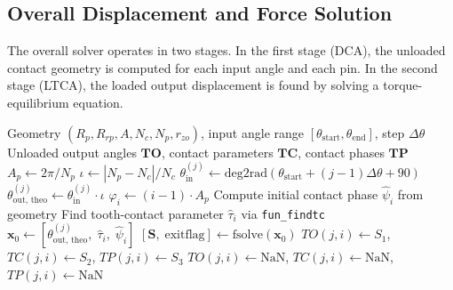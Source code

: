 \documentclass{article}
\begin{document}
\subsection{Overall Displacement and Force Solution}
\label{sec:alg_overall}

The overall solver operates in two stages. In the first stage (DCA), the unloaded contact geometry is computed for each input angle and each pin. In the second stage (LTCA), the loaded output displacement is found by solving a torque-equilibrium equation.

\begin{algorithm}[t]
\caption{DCA: Unloaded Contact Geometry}\label{alg:dca}
\begin{algorithmic}[1]
\Require Geometry $(R_p, R_{rp}, A, N_c, N_p, r_{zo})$, input angle range $[\theta_\text{start}, \theta_\text{end}]$, step $\Delta\theta$
\Ensure Unloaded output angles $\mathbf{TO}$, contact parameters $\mathbf{TC}$, contact phases $\mathbf{TP}$
\State $A_p \gets 2\pi / N_p$ 
\State $\iota \gets |N_p - N_c| / N_c$ 
    \State $\theta_\text{in}^{(j)} \gets \text{deg2rad}(\theta_\text{start} + (j-1)\Delta\theta + 90)$
    \State $\theta_\text{out, theo}^{(j)} \gets \theta_\text{in}^{(j)} \cdot \iota$
        \State $\varphi_i \gets (i-1) \cdot A_p$ 
        \State Compute initial contact phase $\hat\psi_i$ from geometry
        \State Find tooth-contact parameter $\hat\tau_i$ via \texttt{fun\_findtc}
        \State $\mathbf{x}_0 \gets [\theta_\text{out, theo}^{(j)},\; \hat\tau_i,\; \hat\psi_i]$ 
        \State $[\mathbf{S},\; \text{exitflag}] \gets \text{fsolve}(\mathbf{x}_0)$ 
            \State $TO(j,i) \gets S_1$, $TC(j,i) \gets S_2$, $TP(j,i) \gets S_3$
        \Else
            \State $TO(j,i) \gets \text{NaN}$, $TC(j,i) \gets \text{NaN}$, $TP(j,i) \gets \text{NaN}$
        \EndIf
    \EndFor
\EndFor
\end{algorithmic}
\end{algorithm}
\end{document}
